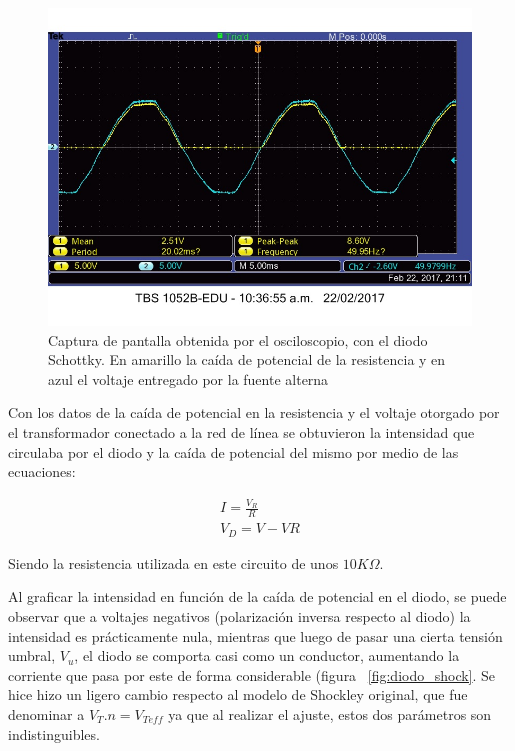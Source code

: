 \documentclass[twoside,twocolumn,a4paper]{article}
\begin{document}
\begin{figure}[h]
\includegraphics[width=\linewidth]{Diodo.jpg}
\captionsetup{justification=centering}
\caption{Captura de pantalla obtenida por el osciloscopio, con el diodo Schottky. En amarillo la ca\'ida de potencial de la resistencia y en azul el voltaje entregado por la fuente alterna}
\label{fig:diodo}
\end{figure}

Con los datos de la ca\'ida de potencial en la resistencia y el voltaje otorgado por el transformador conectado a la red de l\'inea se obtuvieron la intensidad que circulaba por el diodo y la ca\'ida de potencial del mismo por medio de las ecuaciones:

\begin{gather}
I=\frac{V_R}{R} \\
V_D=V-VR
\end{gather}

Siendo la resistencia utilizada en este circuito de unos $10 K\Omega$.
\bigbreak

Al graficar la intensidad en funci\'on de la ca\'ida de potencial en el diodo, se puede observar que a voltajes negativos (polarizaci\'on inversa respecto al diodo) la intensidad es pr\'acticamente nula, mientras que luego de pasar una cierta tensi\'on umbral, $V_u$, el diodo se comporta casi como un conductor, aumentando la corriente que pasa por este de forma considerable (figura ~\ref{fig:diodo_shock}. Se hice hizo un ligero cambio respecto al modelo de Shockley original, que fue denominar a $V_T . n = V_{Teff}$ ya que al realizar el ajuste, estos dos par\'ametros son indistinguibles.
\end{document}
